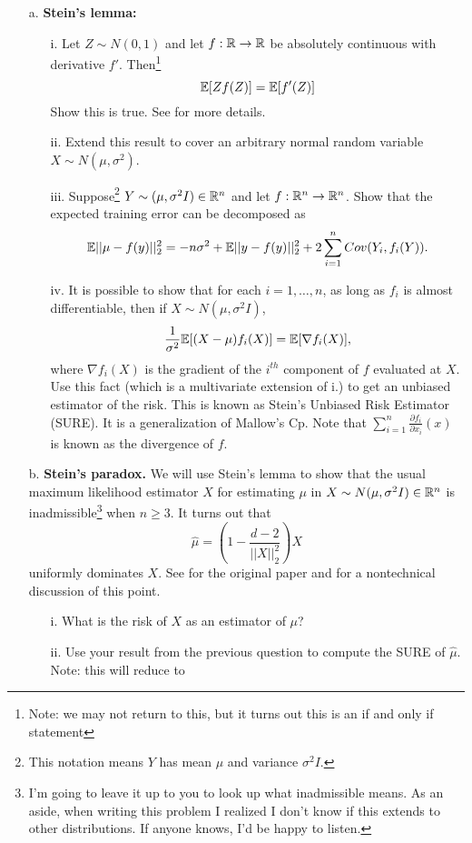 \documentclass[11pt]{article}
\begin{document}
\begin{enumerate}
\begin{itemize}
\item[a.] \textbf{Stein's lemma:}
\begin{itemize}
\item[i.] Let $Z \sim N(0,1)$ and let $f: \mathbb{R} \rightarrow \mathbb{R}$ be absolutely continuous with derivative $f'$.  Then\footnote{Note:
we may not return to this, but it turns out this is an if and only if statement}
\[
\mathbb{E}[Z f(Z)] = \mathbb{E}[f'(Z)]
\]
Show this is true. See \cite{stein1981estimation} for more details.
\item[ii.] Extend this result to cover an arbitrary normal random variable $X \sim N(\mu,\sigma^2)$.
\item[iii.]  Suppose\footnote{This notation means $Y$ has mean $\mu$ and variance $\sigma^2I$.} 
$Y \sim (\mu,\sigma^2I) \in \mathbb{R}^n$ and let $f: \mathbb{R}^n \rightarrow \mathbb{R}^n$.  Show that the expected training error can
be decomposed as
\[
\mathbb{E}||\mu - f(y)||_2^2 = -n\sigma^2 + \mathbb{E}||y - f(y)||_2^2 + 2 \sum_{i=1}^n Cov(Y_i,f_i(Y)).
\]
\item[iv.] It is possible to show that for each $i = 1,\ldots,n$, as long as $f_i$ is almost differentiable, then if $X \sim N(\mu,\sigma^2I)$,
\[
\frac{1}{\sigma^2} \mathbb{E}[(X-\mu)f_i(X)] = \mathbb{E}[\nabla f_i(X)],
\]
where $\nabla f_i(X)$ is the gradient of the $i^{th}$ component of $f$ evaluated at $X$.  Use this fact (which is a multivariate 
extension of i.) to get an unbiased estimator of the risk.  This is known as Stein's Unbiased Risk Estimator (SURE).  It is a
generalization of Mallow's Cp.  Note that $\sum_{i=1}^n \frac{\partial f_i}{\partial x_i}(x)$ is known as the divergence of $f$.
\end{itemize} 
\item[b.] \textbf{Stein's paradox.}  We will use Stein's lemma to show
that the usual maximum likelihood estimator $X$ for estimating $\mu$ in $X \sim N(\mu,\sigma^2I) \in \mathbb{R}^n$ is inadmissible\footnote{I'm going to leave 
it up to you to look up what inadmissible means. As an aside, when writing this problem I realized I don't know if
this extends to other distributions.  If anyone knows, I'd be happy to listen.} when $n \geq 3$.
It turns out that 
\[
\hat\mu = \left(1 - \frac{d-2}{||X||_2^2}\right) X
\]
uniformly dominates $X$.  See \cite{Stein1956Inadmissibility} for the original paper
and \cite{efron1977stein} for a nontechnical discussion of this point.
\begin{itemize}
\item[i.] What is the risk of $X$ as an estimator of $\mu$?
\item[ii.] Use your result from the previous question to compute the SURE of $\hat\mu$.  Note: this will reduce to

\end{itemize}
\end{itemize}
\end{enumerate}
\end{document}
